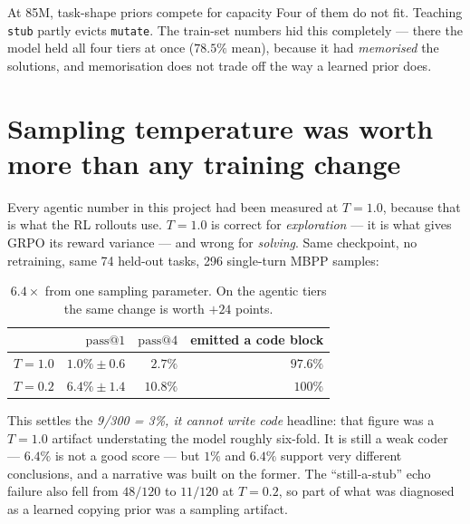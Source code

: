 \documentclass[10pt,a4paper]{article}
\newcommand{\code}[1]{\texttt{\small #1}}
\begin{document}
\begin{finding}{At 85M, task-shape priors compete for capacity}
Four of them do not fit. Teaching \code{stub} partly evicts \code{mutate}. The
train-set numbers hid this completely --- there the model held all four tiers
at once ($78.5\%$ mean), because it had \emph{memorised} the solutions, and
memorisation does not trade off the way a learned prior does.
\end{finding}

\section{Sampling temperature was worth more than any training change}

Every agentic number in this project had been measured at $T{=}1.0$, because
that is what the RL rollouts use. $T{=}1.0$ is correct for \emph{exploration} ---
it is what gives GRPO its reward variance --- and wrong for \emph{solving}.
Same checkpoint, no retraining, same 74 held-out tasks, 296 single-turn MBPP
samples:

\begin{table}[h]
\centering\small
\begin{tabular}{@{}lrrr@{}}
\toprule
& $\mathrm{pass@}1$ & $\mathrm{pass@}4$ & emitted a code block \\
\midrule
$T=1.0$ & $1.0\% \pm 0.6$ & $2.7\%$ & $97.6\%$ \\
$T=0.2$ & $\mathbf{6.4\% \pm 1.4}$ & $\mathbf{10.8\%}$ & $100\%$ \\
\bottomrule
\end{tabular}
\caption{$6.4\times$ from one sampling parameter. On the agentic tiers the same
change is worth ${+}24$ points.}
\end{table}

\noindent This settles the \emph{9/300 = 3\%, it cannot write code} headline:
that figure was a $T{=}1.0$ artifact understating the model roughly six-fold. It
is still a weak coder --- $6.4\%$ is not a good score --- but $1\%$ and $6.4\%$
support very different conclusions, and a narrative was built on the former.
The ``still-a-stub'' echo failure also fell from $48/120$ to $11/120$ at
$T{=}0.2$, so part of what was diagnosed as a learned copying prior was a
sampling artifact.
\end{document}
